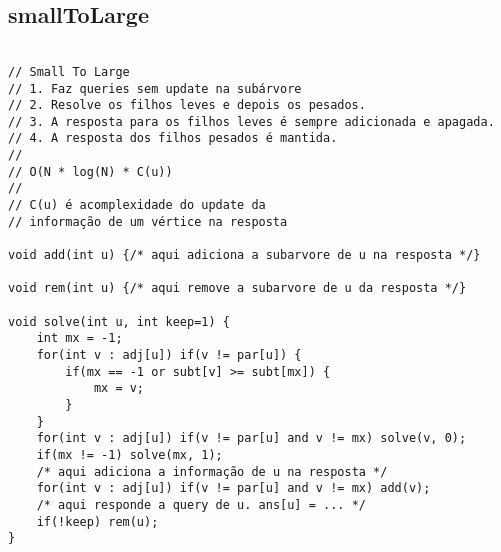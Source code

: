 \documentclass[landscape,twocolumn,10pt,a4paper]{article}
\begin{document}
\subsection{smallToLarge}
\begin{verbatim}

// Small To Large
// 1. Faz queries sem update na subárvore
// 2. Resolve os filhos leves e depois os pesados. 
// 3. A resposta para os filhos leves é sempre adicionada e apagada. 
// 4. A resposta dos filhos pesados é mantida.
//
// O(N * log(N) * C(u))
// 
// C(u) é acomplexidade do update da
// informação de um vértice na resposta

void add(int u) {/* aqui adiciona a subarvore de u na resposta */}

void rem(int u) {/* aqui remove a subarvore de u da resposta */}
 
void solve(int u, int keep=1) {
    int mx = -1;
    for(int v : adj[u]) if(v != par[u]) {
        if(mx == -1 or subt[v] >= subt[mx]) {
            mx = v;
        }
    }
    for(int v : adj[u]) if(v != par[u] and v != mx) solve(v, 0);
    if(mx != -1) solve(mx, 1);
    /* aqui adiciona a informação de u na resposta */
    for(int v : adj[u]) if(v != par[u] and v != mx) add(v);
    /* aqui responde a query de u. ans[u] = ... */
    if(!keep) rem(u);
}\end{verbatim}
\end{document}
